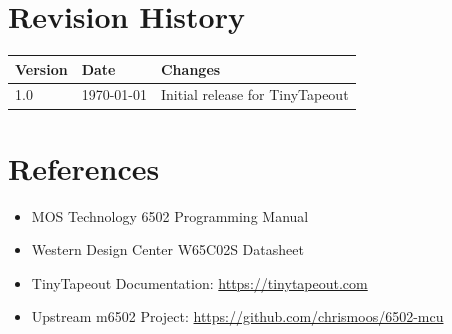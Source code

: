 \documentclass[11pt,a4paper]{article}
\begin{document}
\section{Revision History}

\begin{table}[H]
\centering
\begin{tabular}{lll}
\toprule
\textbf{Version} & \textbf{Date} & \textbf{Changes} \\
\midrule
1.0 & \today & Initial release for TinyTapeout \\
\bottomrule
\end{tabular}
\end{table}

\section{References}

\begin{itemize}
    \item MOS Technology 6502 Programming Manual
    \item Western Design Center W65C02S Datasheet
    \item TinyTapeout Documentation: \url{https://tinytapeout.com}
    \item Upstream m6502 Project: \url{https://github.com/chrismoos/6502-mcu}
\end{itemize}
\end{document}
